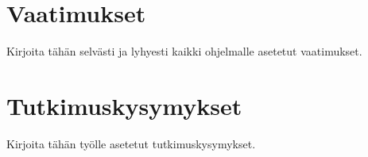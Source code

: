 \section{Vaatimukset}
\begin{it}
	Kirjoita tähän selvästi ja lyhyesti kaikki ohjelmalle asetetut vaatimukset.
\end{it}


\section{Tutkimuskysymykset}
\begin{it}
	Kirjoita tähän työlle asetetut tutkimuskysymykset.
\end{it}